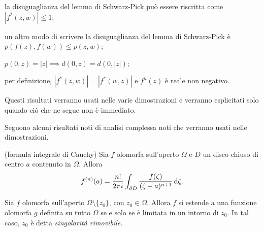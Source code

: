 \begin{oss}
  \begin{nlist}
    \item la disuguaglianza del lemma di Schwarz-Pick può essere riscritta come $|f^*(z,w)| \le 1$;
    \item  un altro modo di scrivere la disuguaglianza del lemma di Schwarz-Pick è $p(f(z),f(w)) \le p(z,w)$;
    \item $p(0,z)=|z| \implies d(0,z)=d(0,|z|)$;
    \item per definizione, $|f^*(z,w)|=|f^*(w,z)|$ e $f^h(z)$ è reale non negativo.
  \end{nlist}
  Questi risultati verranno usati nelle varie dimostrazioni e verranno esplicitati solo quando ciò che ne segue non è immediato.
\end{oss}

Seguono alcuni risultati noti di analisi complessa noti che verranno usati nelle dimostrazioni.

\begin{thm}
  (formula integrale di Cauchy) Sia $f$ olomorfa sull'aperto $\Omega$ e $D$ un disco chiuso di centro $a$ contenuto in $\Omega$. Allora
  \begin{equation}
    f^{(n)}(a)=\frac{n!}{2\pi i} \int_{\partial D} \frac{f(\zeta)}{(\zeta-a)^{n+1}}\mathop{}\!\mathrm{d}\zeta.
  \end{equation}
\end{thm}

\begin{prop}
  Sia $f$ olomorfa sull'aperto $\Omega \setminus\{z_0\}$, con $z_0 \in \Omega$. Allora $f$ si estende a una funzione olomorfa $g$ definita su tutto $\Omega$ se e solo se è limitata in un intorno di $z_0$. In tal caso, $z_0$ è detta \textit{singolarità rimovibile}.
\end{prop}
